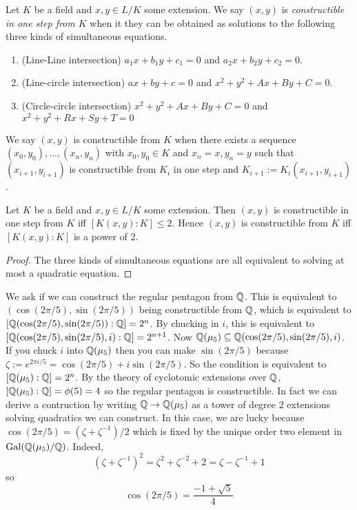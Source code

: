 \documentclass{article}
\begin{document}
\begin{dfn}
  
  Let $K$ be a field and $x , y \in L / K$ some extension.
  We say $(x , y)$ is \emph{constructible in one step from $K$}
  when it they can be obtained as solutions to
  the following three kinds of simultaneous equations.
  \begin{enumerate}
    \item (Line-Line intersection) $a_1 x + b_1 y + c_1 = 0$ and 
    $a_2 x + b_2 y + c_2 = 0$.
    \item (Line-circle intersection)
    $a x + b y + c = 0$ and $x^2 + y^2 + A x + B y + C = 0$.
    \item (Circle-circle intersection)
    $x^2 + y^2 + A x + B y + C = 0$ and 
    $x^2 + y^2 + R x + S y + T = 0$
  \end{enumerate}
  We say $(x , y)$ is constructible from $K$
  when there exists a sequence $(x_0 , y_0) , \dots , (x_n , y_n)$
  with $x_0 , y_0 \in K$ and $x_n = x , y_n = y$ such that
  $(x_{i+1} , y_{i+1})$ is constructible from $K_i$ in one step
  and $K_{i+1} := K_i(x_{i+1} , y_{i+1})$.
\end{dfn}
\begin{prop}
  Let $K$ be a field and $x , y \in L / K$ some extension.
  Then $(x , y)$ is {constructible in one step from $K$}
  iff $[K(x , y) : K] \leq 2$.
  Hence $(x , y)$ is constructible from $K$ iff
  $[K(x , y) : K]$ is a power of 2.
\end{prop}
\begin{proof}
  The three kinds of simultaneous equations
  are all equivalent to solving at most a quadratic equation.
\end{proof}

\begin{eg}

  We ask if we can construct the regular pentagon from $\mathbb{Q}$.
  This is equivalent to $(\cos(2\pi / 5) , \sin(2\pi/5))$
  being constructible from $\mathbb{Q}$,
  which is equivalent to 
  $[\mathbb{Q}(\cos(2\pi / 5) , \sin(2\pi/5)) : \mathbb{Q}] = 2^n$.
  By chucking in $i$,
  this is equivalent to 
  $[\mathbb{Q}(\cos(2\pi / 5) , \sin(2\pi/5), i) : \mathbb{Q}] = 2^{n+1}$.
  Now $\mathbb{Q}(\mu_5) \subseteq \mathbb{Q}(\cos(2\pi / 5) , \sin(2\pi/5), i)$.
  If you chuck $i$ into $\mathbb{Q}(\mu_5)$ then
  you can make $\sin(2 \pi / 5)$ because $\zeta := e^{2\pi i / 5} = 
  \cos(2 \pi / 5) + i \sin(2 \pi / 5)$.
  So the condition is equivalent to 
  $[\mathbb{Q}(\mu_5) : \mathbb{Q}] = 2^n$.
  By the theory of cyclotomic extensions over $\mathbb{Q}$,
  $[\mathbb{Q}(\mu_5) : \mathbb{Q}] = \phi(5) = 4$
  so the regular pentagon is constructible.
  In fact we can derive a contruction by
  writing $\mathbb{Q} \to \mathbb{Q}(\mu_5)$ as a tower of degree 2 extensions
  solving quadratics we can construct.
  In this case, we are lucky because 
  $\cos(2 \pi / 5) = (\zeta + \zeta^{-1})/2$ which is fixed by
  the unique order two element in $\operatorname{Gal}(\mathbb{Q}(\mu_5) / \mathbb{Q})$.
  Indeed, \[
    (\zeta + \zeta^{-1})^2 = \zeta^2 + \zeta^{-2} + 2
    = \zeta - \zeta^{-1} +1
  \]
  so \[
    \cos(2\pi / 5) = \frac{-1 + \sqrt{5}}{4}
  \]


\end{eg}
\end{document}
